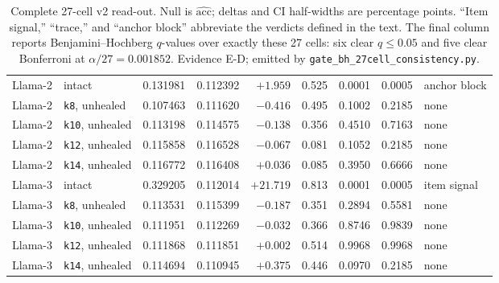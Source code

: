 \begin{table}[H]
\begin{tabular}{llrrrrrrl}
Llama-2 & intact & 0.131981 & 0.112392 & $+1.959$ & 0.525 & 0.0001 & 0.0005 & anchor block \\
Llama-2 & \texttt{k8}, unhealed & 0.107463 & 0.111620 & $-0.416$ & 0.495 & 0.1002 & 0.2185 & none \\
Llama-2 & \texttt{k10}, unhealed & 0.113198 & 0.114575 & $-0.138$ & 0.356 & 0.4510 & 0.7163 & none \\
Llama-2 & \texttt{k12}, unhealed & 0.115858 & 0.116528 & $-0.067$ & 0.081 & 0.1052 & 0.2185 & none \\
Llama-2 & \texttt{k14}, unhealed & 0.116772 & 0.116408 & $+0.036$ & 0.085 & 0.3950 & 0.6666 & none \\
Llama-3 & intact & 0.329205 & 0.112014 & $+21.719$ & 0.813 & 0.0001 & 0.0005 & item signal \\
Llama-3 & \texttt{k8}, unhealed & 0.113531 & 0.115399 & $-0.187$ & 0.351 & 0.2894 & 0.5581 & none \\
Llama-3 & \texttt{k10}, unhealed & 0.111951 & 0.112269 & $-0.032$ & 0.366 & 0.8746 & 0.9839 & none \\
Llama-3 & \texttt{k12}, unhealed & 0.111868 & 0.111851 & $+0.002$ & 0.514 & 0.9968 & 0.9968 & none \\
Llama-3 & \texttt{k14}, unhealed & 0.114694 & 0.110945 & $+0.375$ & 0.446 & 0.0970 & 0.2185 & none \\
\bottomrule
\end{tabular}
\caption{Complete 27-cell v2 read-out. Null is $\widehat{\mathrm{acc}}$;
deltas and CI half-widths are percentage points. ``Item signal,'' ``trace,''
and ``anchor block'' abbreviate the verdicts defined in the text. The final
column reports Benjamini--Hochberg $q$-values over exactly these 27 cells: six
clear $q\leq0.05$ and five clear Bonferroni at $\alpha/27=0.001852$.
Evidence \textsf{E-D}; emitted by \texttt{gate\_bh\_27cell\_consistency.py}.}
\label{tab:v2-full}
\end{table}
